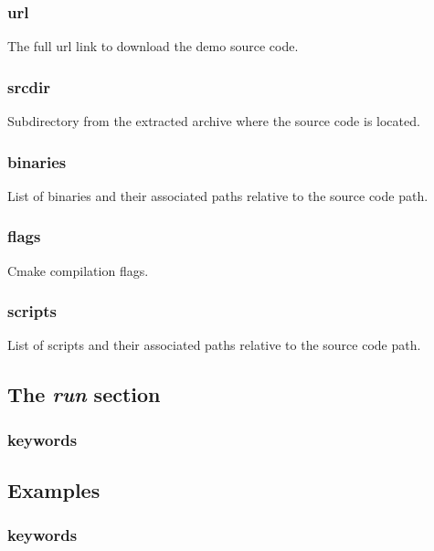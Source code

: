 \subsubsection{url}
The full url link to download the demo source code.
\subsubsection{srcdir}
Subdirectory from the extracted archive where the source code is located.
\subsubsection{binaries}
List of binaries and their associated paths relative to the source code path.
\subsubsection{flags}
Cmake compilation flags.
\subsubsection{scripts}
List of scripts and their associated paths relative to the source code path.

\subsection{The \emph{run} section}
\subsubsection{keywords}

\subsection{Examples}


\subsubsection{keywords}
